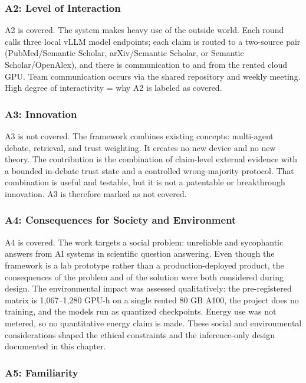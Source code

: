 \subsubsection{A2: Level of Interaction}

A2 is covered. The system makes heavy use of the outside world. Each round calls three local vLLM model endpoints; each claim is routed to a two-source pair (PubMed/Semantic Scholar, arXiv/Semantic Scholar, or Semantic Scholar/OpenAlex), and there is communication to and from the rented cloud GPU. Team communication occurs via the shared repository and weekly meeting. High degree of interactivity = why A2 is labeled as covered.

\subsubsection{A3: Innovation}

A3 is not covered. The framework combines existing concepts: multi-agent debate, retrieval, and trust weighting. It creates no new device and no new theory. The contribution is the combination of claim-level external evidence with a bounded in-debate trust state and a controlled wrong-majority protocol. That combination is useful and testable, but it is not a patentable or breakthrough innovation. A3 is therefore marked as not covered.

\subsubsection{A4: Consequences for Society and Environment}

A4 is covered. The work targets a social problem: unreliable and sycophantic answers from AI systems in scientific question answering. Even though the framework is a lab prototype rather than a production-deployed product, the consequences of the problem and of the solution were both considered during design. The environmental impact was assessed qualitatively: the pre-registered matrix is 1,067--1,280 GPU-h on a single rented 80 GB A100, the project does no training, and the models run as quantized checkpoints. Energy use was not metered, so no quantitative energy claim is made. These social and environmental considerations shaped the ethical constraints and the inference-only design documented in this chapter.

\subsubsection{A5: Familiarity}

